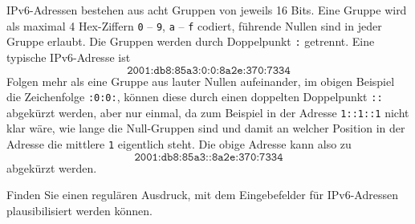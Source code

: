 IPv6-Adressen bestehen aus acht Gruppen von jeweils 16 Bits.
Eine Gruppe wird als maximal 4 Hex-Ziffern \texttt{0} -- \texttt{9},
\texttt{a} -- \texttt{f} codiert, führende Nullen sind in jeder Gruppe erlaubt.
Die Gruppen werden durch Doppelpunkt \texttt{:} getrennt.
Eine typische IPv6-Adresse ist
\[
\texttt{2001:db8:85a3:0:0:8a2e:370:7334}
\]
Folgen mehr als eine Gruppe aus lauter Nullen aufeinander, im obigen
Beispiel die Zeichenfolge \texttt{:0:0:}, können diese 
durch einen doppelten Doppelpunkt \texttt{::} abgekürzt werden, aber
nur einmal, da zum Beispiel in der Adresse \texttt{1::1::1} nicht klar wäre,
wie lange die Null-Gruppen
sind und damit an welcher Position in der Adresse die mittlere \texttt{1}
eigentlich steht.
Die obige Adresse kann also zu
\[
\texttt{2001:db8:85a3::8a2e:370:7334}
\]
abgekürzt werden.

Finden Sie einen regulären Ausdruck, mit dem Eingebefelder für IPv6-Adressen
plausibilisiert werden können.


